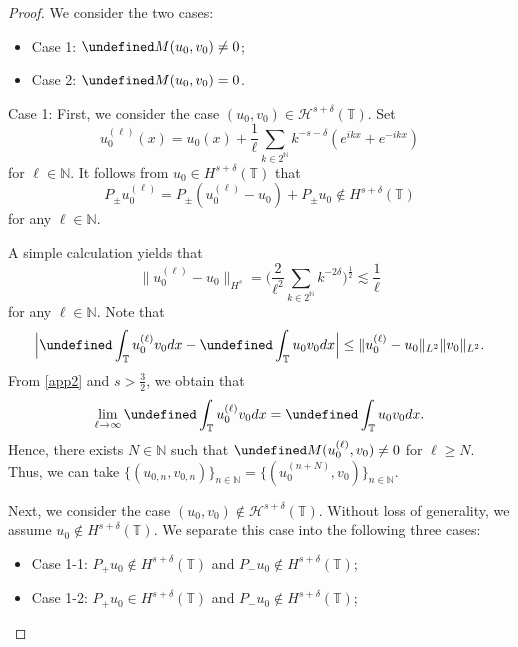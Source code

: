 \documentclass[%
11pt,  reqno]{amsart}
\newcommand{\T}{\mathbb{T}}
\newcommand{\N}{\mathbb{N}}
\renewcommand{\H}{\mathcal H}
\newcommand{\dl}{\delta}
\renewcommand{\l}{\ell}
\newcommand{\les}{\lesssim}
\numberwithin{equation}{section}
\numberwithin{theorem}{section}
\let\Im=\undefined\DeclareMathOperator*{\Im}{Im}
\begin{document}
\begin{proof}
We consider the two cases:
\begin{itemize}
\item Case 1: $\Im M(u_0, v_0) \neq 0$;
\item Case 2: $\Im M(u_0, v_0) = 0$.
\end{itemize}

Case 1: First, we consider the case $(u_0, v_0) \in \H^{s+\dl}(\T)$.
Set
\[
u_{0}^{(\l)}(x) = u_0 (x) + \frac 1\l \sum_{k \in 2^\N} k^{-s-\dl} (e^{i k x} + e^{-ikx})
\]
for $\l \in \N$.
It follows from $u_0 \in H^{s+\dl}(\T)$ that
\begin{equation*}
P_\pm u_0^{(\l)} = P_\pm (u_0^{(\l)} - u_0) + P_\pm u_0 \notin H^{s+\dl}(\T)
\end{equation*}
for any $\l \in \N$.

A simple calculation yields that
\begin{equation}
\| u_{0}^{(\l)} - u_0 \|_{H^s}
= \bigg( \frac 2{\l^2}  \sum_{k \in 2^{\N}} k^{-2\dl} \bigg)^{\frac 12}
\les \frac 1\l
\label{app2}
\end{equation}
for any $\l \in \N$.
Note that
\begin{align*}
\Big|
\Im \int_\T u_0^{(\l)} v_0 dx
- \Im \int_\T u_0 v_0 dx
\Big|
\le
\| u_{0}^{(\l)} - u_0 \|_{L^2} \|v_0\|_{L^2}.
\end{align*}
From \eqref{app2} and $s>\frac 32$,
we obtain that
\[
\lim_{\l \to \infty} \Im \int_\T u_{0}^{(\l)} v_0 dx
= \Im \int_\T u_0 v_0 dx.
\]
Hence, there exists $N \in \N$ such that $\Im M (u_{0}^{(\l)}, v_0) \neq 0$ for $\l \ge N$.
Thus, we can take $\{(u_{0, n}, v_{0, n})\}_{n \in \N} = \{(u_{0}^{(n+N)}, v_0)\}_{n \in \N}$.

Next, we consider the case $(u_0, v_0) \notin \H^{s+\dl}(\T)$.
Without loss of generality, we assume $u_0 \notin H^{s+\dl}(\T)$.
We separate this case into the following three cases:
\begin{itemize}
\item
Case 1-1:
$P_+ u_0 \notin H^{s+\dl}(\T)$ and $P_- u_0 \notin H^{s+\dl}(\T)$;

\item
Case 1-2:
$P_+ u_0 \in H^{s+\dl}(\T)$ and $P_- u_0 \notin H^{s+\dl}(\T)$;


\end{itemize}
\end{proof}
\end{document}
